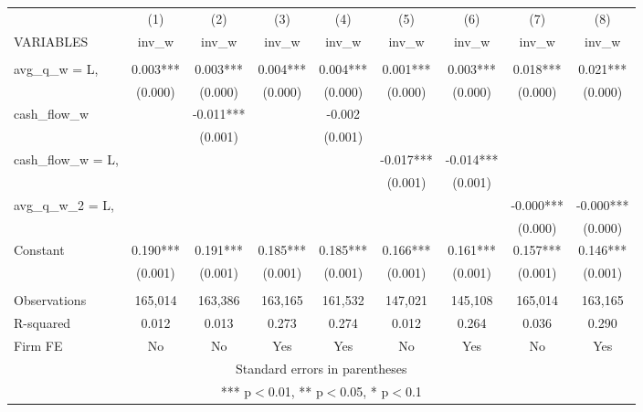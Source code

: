 \documentclass[]{article}
\begin{document}
\begin{tabular}{lcccccccc} \hline
 & (1) & (2) & (3) & (4) & (5) & (6) & (7) & (8) \\
VARIABLES & inv\_w & inv\_w & inv\_w & inv\_w & inv\_w & inv\_w & inv\_w & inv\_w \\ \hline
 &  &  &  &  &  &  &  &  \\
avg\_q\_w = L, & 0.003*** & 0.003*** & 0.004*** & 0.004*** & 0.001*** & 0.003*** & 0.018*** & 0.021*** \\
 & (0.000) & (0.000) & (0.000) & (0.000) & (0.000) & (0.000) & (0.000) & (0.000) \\
cash\_flow\_w &  & -0.011*** &  & -0.002 &  &  &  &  \\
 &  & (0.001) &  & (0.001) &  &  &  &  \\
cash\_flow\_w = L, &  &  &  &  & -0.017*** & -0.014*** &  &  \\
 &  &  &  &  & (0.001) & (0.001) &  &  \\
avg\_q\_w\_2 = L, &  &  &  &  &  &  & -0.000*** & -0.000*** \\
 &  &  &  &  &  &  & (0.000) & (0.000) \\
Constant & 0.190*** & 0.191*** & 0.185*** & 0.185*** & 0.166*** & 0.161*** & 0.157*** & 0.146*** \\
 & (0.001) & (0.001) & (0.001) & (0.001) & (0.001) & (0.001) & (0.001) & (0.001) \\
 &  &  &  &  &  &  &  &  \\
Observations & 165,014 & 163,386 & 163,165 & 161,532 & 147,021 & 145,108 & 165,014 & 163,165 \\
R-squared & 0.012 & 0.013 & 0.273 & 0.274 & 0.012 & 0.264 & 0.036 & 0.290 \\
 Firm FE & No & No & Yes & Yes & No & Yes & No & Yes \\ \hline
\multicolumn{9}{c}{ Standard errors in parentheses} \\
\multicolumn{9}{c}{ *** p$<$0.01, ** p$<$0.05, * p$<$0.1} \\
\end{tabular}
\end{document}
